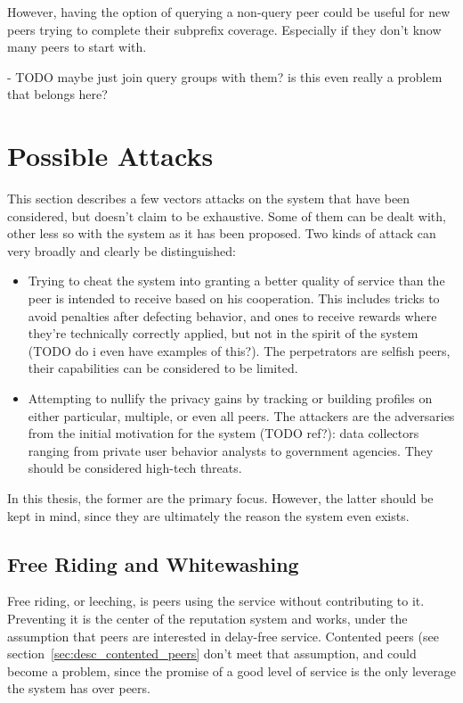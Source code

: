 However, having the option of querying a non-query peer could be useful for new
peers trying to complete their subprefix coverage. Especially if they don't know
many peers to start with.

- TODO maybe just join query groups with them? is this even really a problem
  that belongs here?

\section{Possible Attacks}
This section describes a few vectors attacks on the system that have been
considered, but doesn't claim to be exhaustive. Some of them can be dealt with,
other less so with the system as it has been proposed.  Two kinds of attack can
very broadly and clearly be distinguished:
\begin{itemize}
\item Trying to cheat the system into granting a better quality of service than
the peer is intended to receive based on his cooperation. This includes tricks
to avoid penalties after defecting behavior, and ones to receive rewards where
they're technically correctly applied, but not in the spirit of the system (TODO
do i even have examples of this?). The perpetrators are selfish peers, their
capabilities can be considered to be limited.
\item Attempting to nullify the privacy gains by tracking or building profiles
on either particular, multiple, or even all peers. The attackers are the
adversaries from the initial motivation for the system (TODO ref?): data
collectors ranging from private user behavior analysts to government agencies.
They should be considered high-tech threats.
\end{itemize}

In this thesis, the former are the primary focus. However, the latter should be
kept in mind, since they are ultimately the reason the system even exists.

\subsection{Free Riding and Whitewashing}
Free riding, or leeching, is peers using the service without contributing to it.
Preventing it is the center of the reputation system and works, under the
assumption that peers are interested in delay-free service. Contented peers (see
section~\ref{sec:desc_contented_peers} don't meet that assumption, and could
become a problem, since the promise of a good level of service is the only
leverage the system has over peers.

